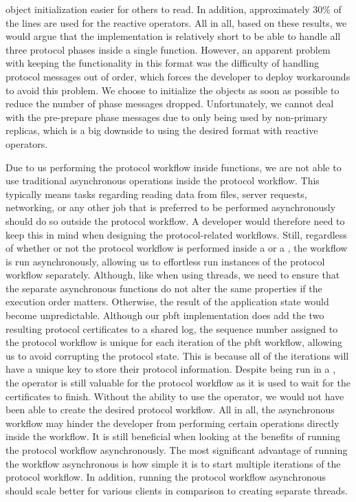 object initialization easier for others to read. In addition, approximately 30\% of the lines are used for the reactive operators. All in all, based on these results, we would argue that the implementation is relatively short to be able to handle all three protocol phases inside a single function. However, an apparent problem with keeping the functionality in this format was the difficulty of handling protocol messages out of order, which forces the developer to deploy workarounds to avoid this problem. We choose to initialize the  objects as soon as possible to reduce the number of phase messages dropped. Unfortunately, we cannot deal with the pre-prepare phase messages due to only being used by non-primary replicas, which is a big downside to using the desired format with reactive operators.

Due to us performing the protocol workflow inside  functions, we are not able to use traditional asynchronous operations inside the protocol workflow. This typically means tasks regarding reading data from files, server requests, networking, or any other job that is preferred to be performed asynchronously should do so outside the protocol workflow. A developer would therefore need to keep this in mind when designing the protocol-related workflows. Still, regardless of whether or not the protocol workflow is performed inside a  or a , the workflow is run asynchronously, allowing us to effortless run instances of the protocol workflow separately. Although, like when using threads, we need to ensure that the separate asynchronous functions do not alter the same properties if the execution order matters. Otherwise, the result of the application state would become unpredictable. Although our \ac{pbft} implementation does add the two resulting protocol certificates to a shared log, the sequence number assigned to the protocol workflow is unique for each iteration of the \ac{pbft} workflow, allowing us to avoid corrupting the protocol state. This is because all of the iterations will have a unique key to store their protocol information. Despite being run in a , the  operator is still valuable for the protocol workflow as it is used to wait for the certificates to finish. Without the ability to use the  operator, we would not have been able to create the desired protocol workflow.
All in all, the asynchronous workflow may hinder the developer from performing certain operations directly inside the workflow. It is still beneficial when looking at the benefits of running the protocol workflow asynchronously. The most significant advantage of running the workflow asynchronous is how simple it is to start multiple iterations of the protocol workflow. In addition, running the protocol workflow asynchronous should scale better for various clients in comparison to creating separate threads.

